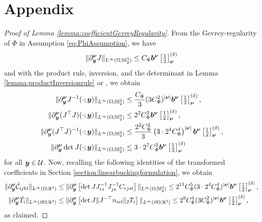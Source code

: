 \section{Appendix}\label{sec:appendix}
\begin{proof}[Proof of Lemma \ref{lemma:coefficientGevreyRegularity}]\label{proof:coefficientRegularity}
    From the Gevrey-regularity of $\Phi$ in Assumption \eqref{eq:PhiAssumption}, we have
    \begin{align*}
        \| \Dnuy  J \|_{L^\infty (\Omega;
        \mathbb{M}_2^3)} \leq C_{\Phi} \bsb^{\bsnu} \fallennudelta 
    \end{align*}
    and with the product rule, inversion, and the determinant in Lemma \ref{lemma:productInversionrule} or \cite[Lemma 2]{chernov2026gevreyclassregularitysteadystate},
    we obtain
    \begin{align*}
        \| \Dnuy J^{-1} (\cdot;\bsy) \|_{L^\infty (\Omega;\mathbb{M}_2^3)}  &\leq \frac{C_\Phi}3  (3 C_\Phi^2)^{\vert \bsnu \vert } \bsb^{\bsnu} \fallennudelta,   \\
        \| \Dnuy  (J^\top J) (\cdot;\bsy) \|_{L^\infty (\Omega;\mathbb{M}_2^3)} &\leq 2^2 C_{\Phi}^2 \bsb^{\bsnu} \fallennudelta,  \\
        \| \Dnuy  (J^\top J)^{-1} (\cdot;\bsy)\|_{L^\infty (\Omega;\mathbb{M}_2^3)} &\leq \frac{2^2C_{\Phi}^2}{3} \left(3 \cdot 2^4C_{\Phi}^4 \right)^{\vert \bsnu \vert }\bsb^{\bsnu} \fallennudelta,  \\
        \| \Dnuy  \det J (\cdot;\bsy) \|_{L^\infty (\Omega;\mathbb{M}_2^3)} &\leq 3 \cdot 2^7 C_{\Phi}^3 \bsb^{\bsnu} \fallennudelta  
    \end{align*}
    for all $\bsy \in \calU$.
    Now, recalling the following identities of the transformed coefficients in Section \ref{section:linearbuckingformulation}, we obtain
    \begin{align*}
         \| \Dnuy \tilde{\calC}_{ijkl} \|_{L^\infty(\Omega;\R^4)} &\leq \| \Dnuy \left[ \det J J_{ri}^{-1} J_{js}^{-1} C_{rjsl} \right]  \|_{L^\infty(\Omega;\mathbb{M}_4^3)} \leq  2^{11} C^5_{\Phi} (3\cdot 2^4 C^4_\Phi)^{\vert \bsnu \vert } \bsb^\bsnu \fallennudelta,\\
          \| \Dnuy \tilde T_{i} \|_{L^\infty(\partial\Omega;\R^{3})} &\leq \| \Dnuy \left[ \det J \| J^{-\top} n_{\text{ref}} \|_2  T_i \right] \|_{L^\infty(\partial\Omega;\R^3)} \leq 2^9 C^4_\Phi (3C^2_\Phi)^{\vert \bsnu \vert} \bsb^\bsnu \fallennudelta,
    \end{align*}
  as claimed.
\end{proof}


